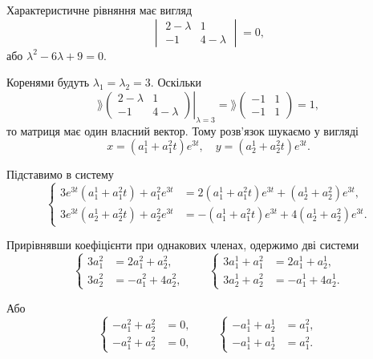 \begin{solution}
    Характеристичне рівняння має вигляд
    \[ \begin{vmatrix}
        2 - \lambda & 1 \\
        -1 & 4 - \lambda 
    \end{vmatrix} = 0, \]
    або $\lambda^2 - 6 \lambda + 9 = 0$. \parvskip
    
    Коренями будуть $\lambda_1 = \lambda_2 = 3$. Оскільки
    \[ \rang \left. \begin{pmatrix} 
        2 - \lambda & 1 \\
        -1 & 4 - \lambda 
    \end{pmatrix} \right|_{\lambda = 3} 
    = 
    \rang \begin{pmatrix} 
        -1 & 1 \\
        -1 & 1
    \end{pmatrix} = 1, \]
    то матриця має один власний вектор. Тому розв'язок шукаємо у вигляді
    \[ x = (a_1^1 + a_1^2 t) e^{3t}, \quad y = (a_2^1 + a_2^2 t) e^{3t}. \]
    
    Підставимо в систему
    \[ \left\{ \begin{aligned}
        3 e^{3t} (a_1^1 + a_1^2 t) + a_1^2 e^{3t} &= 2 (a_1^1 + a_1^2 t) e^{3t} + (a_2^1 + a_2^2) e^{3t}, \\
        3 e^{3t} (a_2^1 + a_2^2 t) + a_2^2 e^{3t} &= - (a_1^1 + a_1^2 t) e^{3t} + 4 (a_2^1 + a_2^2) e^{3t}.
    \end{aligned} \right. \]
    
    Прирівнявши коефіцієнти при однакових членах, одержимо дві системи
    \[ \left\{ \begin{aligned} 
        3 a_1^2 &= 2 a_1^2 + a_2^2, \\
        3 a_2^2 &= -a_1^2 + 4 a_2^2,
    \end{aligned} \right. 
    \qquad
    \left\{ \begin{aligned} 
        3 a_1^1 + a_1^2 &= 2 a_1^1 + a_2^1, \\
        3 a_2^1 + a_2^2 &= -a_1^1 + 4 a_2^1.
    \end{aligned} \right.\]

    Або
    \[ \left\{ \begin{aligned} 
        -a_1^2 + a_2^2 &= 0, \\
        -a_1^2 + a_2^2 &= 0,
    \end{aligned} \right. 
    \qquad
    \left\{ \begin{aligned} 
        -a_1^1 + a_2^1 &= a_1^2, \\
        -a_1^1 + a_2^1 &= a_1^2.
    \end{aligned} \right.\]


\end{solution}
